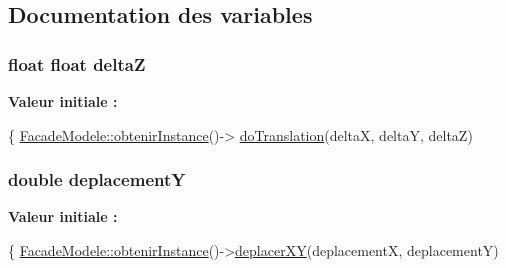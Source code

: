 \subsection{Documentation des variables}
\hypertarget{group__inf2990_ga9644447719a7934b7eca34bdf6656363}{
\subsubsection[{delta\-Z}]{\setlength{\rightskip}{0pt plus 5cm}float float delta\-Z}}\label{group__inf2990_ga9644447719a7934b7eca34bdf6656363}
{\bfseries Valeur initiale \-:}
\begin{DoxyCode}
\{
        \hyperlink{group__inf2990_ga63593b81c6f3cc2251e2b61d9e8fc670}{FacadeModele::obtenirInstance}()->
      \hyperlink{group__inf2990_ga3c29bb5fb742aacf7bea3f62357c4f48}{doTranslation}(deltaX, deltaY, deltaZ)
\end{DoxyCode}
\hypertarget{group__inf2990_ga84b180f09e9802d980aa3f7cc71703da}{
\subsubsection[{deplacement\-Y}]{\setlength{\rightskip}{0pt plus 5cm}double deplacement\-Y}}\label{group__inf2990_ga84b180f09e9802d980aa3f7cc71703da}
{\bfseries Valeur initiale \-:}
\begin{DoxyCode}
\{
        \hyperlink{group__inf2990_ga63593b81c6f3cc2251e2b61d9e8fc670}{FacadeModele::obtenirInstance}()->\hyperlink{group__inf2990_ga1d0468d14d18990c39861b22d4921a7c}{deplacerXY}(deplacementX, 
      deplacementY)
\end{DoxyCode}
